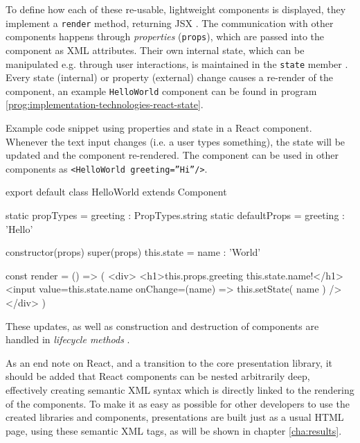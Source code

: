To define how each of these re-usable, lightweight components is displayed, they implement a \texttt{render} method, returning JSX \cite{jsx}. The communication with other components happens through \emph{properties} (\texttt{props}), which are passed into the component as XML attributes. Their own internal state, which can be manipulated e.g. through user interactions, is maintained in the \texttt{state} member \cite{react-docu}. Every state (internal) or property (external) change causes a re-render of the component, an example \texttt{HelloWorld} component can be found in program \ref{prog:implementation-technologies-react-state}.
%
\begin{program}
\caption{Example code snippet using properties and state in a React component. Whenever the text input changes (i.e. a user types something), the state will be updated and the component re-rendered. The component can be used in other components as \texttt{<HelloWorld greeting=''Hi''/>}.}
\label{prog:implementation-technologies-react-state}
\begin{JsCode}
export default class HelloWorld extends Component {
  static propTypes = { greeting : PropTypes.string }
  static defaultProps = { greeting : 'Hello' }

  constructor(props) {
    super(props)
    this.state = { name : 'World' }
  }

  const render = () => (
    <div>
      <h1>{this.props.greeting} {this.state.name}!</h1>
      <input value={this.state.name} onChange={(name) => this.setState({ name })} />
    </div>
  )
}
\end{JsCode}
\end{program}
%
These updates, as well as construction and destruction of components are handled in \emph{lifecycle methods} \cite{react-docu}.

As an end note on React, and a transition to the core presentation library, it should be added that React components can be nested arbitrarily deep, effectively creating semantic XML syntax which is directly linked to the rendering of the components. To make it as easy as possible for other developers to use the created libraries and components, presentations are built just as a usual HTML page, using these semantic XML tags, as will be shown in chapter \ref{cha:results}.

